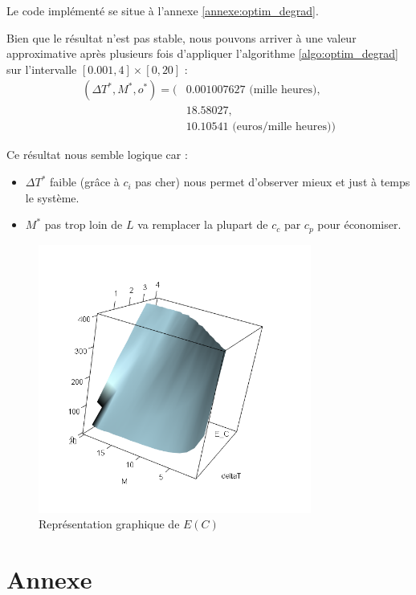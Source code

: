 \documentclass[10pt,a4paper]{article}
\begin{document}
Le code implémenté se situe à l'annexe \ref{annexe:optim_degrad}. 

Bien que le résultat n'est pas stable, nous pouvons arriver à une valeur approximative après plusieurs fois d'appliquer l'algorithme \ref{algo:optim_degrad} sur l'intervalle $[0.001, 4] \times [0, 20]$ : 
\begin{align*}
    (\Delta T^*, M^*, o^*) = (& 0.001007627 \text{ (mille heures)},\\
    & 18.58027,\\
    & 10.10541 \text{ (euros/mille heures)})
\end{align*}

Ce résultat nous semble logique car :
\begin{itemize}
    \item $\Delta T^*$ faible (grâce à $c_i$ pas cher) nous permet d'observer mieux et just à temps le système.
    \item $M^*$ pas trop loin de $L$ va remplacer la plupart de $c_c$ par $c_p$ pour économiser.
\end{itemize}

\begin{figure}
    \centering
    \caption{Représentation graphique de $E(C)$}
    \label{fig:e_c}
    \includegraphics[width=0.8\textwidth]{img/E_C_degrad.png}
\end{figure}

\clearpage
\section{Annexe}
\end{document}
